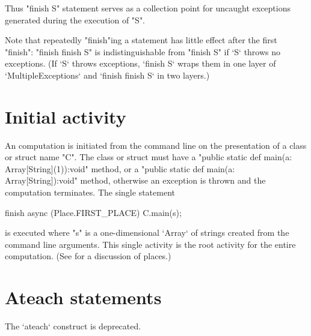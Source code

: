 Thus \xcd"finish S" statement serves as a collection point for
uncaught exceptions generated during the execution of \xcd"S".

Note that repeatedly \xcd"finish"ing a statement has little effect after
the first \xcd"finish": \xcd"finish finish S" is indistinguishable
from \xcd"finish S" if \xcd`S` throws no exceptions.  (If \xcd`S` throws
exceptions, \xcd`finish S` wraps them in one layer of 
\xcd`MultipleExceptions` and \xcd`finish finish S` in two layers.)


\section{Initial activity}\label{initial-computation}

An \Xten{} computation is initiated from the command line on the
presentation of a class or struct name \xcd"C". The class or struct must have a
\xcd"public static def main(a: Array[String](1)):void" method, 
or a \xcd"public static def main(a: Array[String]):void" method, 
otherwise an exception is thrown
and the computation terminates.  The single statement
\begin{xten}
finish async (Place.FIRST_PLACE) {
  C.main(s);
}
\end{xten} 
\noindent is executed where \xcd"s" is a one-dimensional \xcd`Array` of
strings created 
from the command line arguments. This single activity is the root activity
for the entire computation. (See  for a discussion of
places.)


\section{Ateach statements}\label{ateach-section}
\deprecated{} The \xcd`ateach` construct is deprecated.

